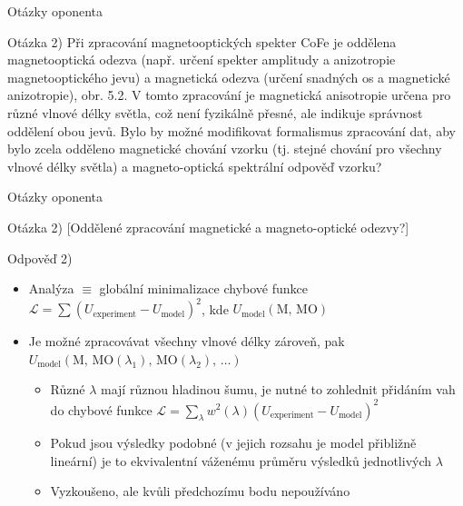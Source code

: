 \begin{frame}{Otázky oponenta}
    \begin{block}{Otázka 2)}
        Při zpracování magnetooptických spekter CoFe je oddělena magnetooptická odezva (např. určení spekter amplitudy a anizotropie magnetooptického jevu) a magnetická odezva (určení snadných os a magnetické anizotropie), obr. 5.2.
        V tomto zpracování je magnetická anisotropie určena pro různé vlnové délky světla, což není fyzikálně přesné, ale indikuje správnost oddělení obou jevů.
        Bylo by možné modifikovat formalismus zpracování dat, aby bylo zcela odděleno magnetické chování vzorku (tj. stejné chování pro všechny vlnové délky světla) a magneto-optická spektrální odpověď vzorku?
    \end{block}
\end{frame}
\begin{frame}{Otázky oponenta}
    \begin{block}{Otázka 2)}
        [Oddělené zpracování magnetické a magneto-optické odezvy?]
    \end{block}
    
    \begin{exampleblock}{Odpověď 2)}
        \begin{itemize}
        \item Analýza $\equiv$ globální minimalizace chybové funkce $\mathcal{L} = \sum \left( U_{\textrm{experiment}} - U_{\textrm{model}} \right)^2$, kde $U_{\textrm{model}}(\textrm{M},\,\textrm{MO})$
        \item Je možné zpracovávat všechny vlnové délky zároveň, pak $U_{\textrm{model}}(\textrm{M},\,\textrm{MO}(\lambda_1),\,\textrm{MO}(\lambda_2),\,\ldots)$
                \begin{itemize}
                    \item Různé $\lambda$ mají různou hladinou šumu, je nutné to zohlednit přidáním vah do chybové funkce $\mathcal{L}=\sum_\lambda w^2(\lambda) \left(U_{\textrm{experiment}} - U_{\textrm{model}}\right)^2$
                    \item Pokud jsou výsledky podobné (v jejich rozsahu je model přibližně lineární) je to ekvivalentní váženému průměru výsledků jednotlivých $\lambda$
                    \item Vyzkoušeno, ale kvůli předchozímu bodu nepoužíváno
                \end{itemize}
        \end{itemize}
    \end{exampleblock}
    
\end{frame}


